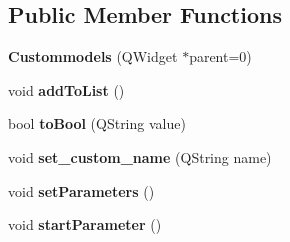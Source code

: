 \subsection*{Public Member Functions}
\begin{DoxyCompactItemize}
\item 
{\bfseries Custommodels} (Q\+Widget $\ast$parent=0)\hypertarget{class_custommodels_afbdddfe12335dc1a99a0df50b6d59c5e}{}\label{class_custommodels_afbdddfe12335dc1a99a0df50b6d59c5e}

\item 
void {\bfseries add\+To\+List} ()\hypertarget{class_custommodels_a0155dbcc4ecb61c4fa1ae51f78d4c7fa}{}\label{class_custommodels_a0155dbcc4ecb61c4fa1ae51f78d4c7fa}

\item 
bool {\bfseries to\+Bool} (Q\+String value)\hypertarget{class_custommodels_a9b1297a0253a388c370618b44b830858}{}\label{class_custommodels_a9b1297a0253a388c370618b44b830858}

\item 
void {\bfseries set\+\_\+custom\+\_\+name} (Q\+String name)\hypertarget{class_custommodels_a0441728f4923986aec40d09d9b927e6b}{}\label{class_custommodels_a0441728f4923986aec40d09d9b927e6b}

\item 
void {\bfseries set\+Parameters} ()\hypertarget{class_custommodels_a59e677dd38af334094efff88d9ce98ed}{}\label{class_custommodels_a59e677dd38af334094efff88d9ce98ed}

\item 
void {\bfseries start\+Parameter} ()\hypertarget{class_custommodels_af2dc416716136532ce56a1fb687a7e84}{}\label{class_custommodels_af2dc416716136532ce56a1fb687a7e84}

\end{DoxyCompactItemize}
